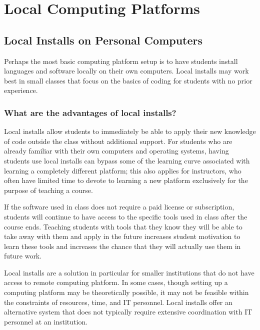 \section{Local Computing Platforms}

\subsection{Local Installs on Personal Computers}\label{subsect:Local Installs}

Perhaps the most basic computing platform setup is to have students install languages and software locally on their own computers. Local installs may work best in small classes that focus on the basics of coding for students with no prior experience. 

\subsubsection{What are the advantages of local installs?}

Local installs allow students to immediately be able to apply their new knowledge of code outside the class without additional support. For students who are already familiar with their own computers and operating systems, having students use local installs can bypass some of the learning curve associated with learning a completely different platform; this also applies for instructors, who often have limited time to devote to learning a new platform exclusively for the purpose of teaching a course.

If the software used in class does not require a paid license or subscription, students will continue to have access to the specific tools used in class after the course ends. Teaching students with tools that they know they will be able to take away with them and apply in the future increases student motivation to learn these tools and increases the chance that they will actually use them in future work.

Local installs are a solution in particular for smaller institutions that do not have access to remote computing platform. In some cases, though setting up a computing platform may be theoretically possible, it may not be feasible within the constraints of resources, time, and IT personnel. Local installs offer an alternative system that does not typically require extensive coordination with IT personnel at an institution.

